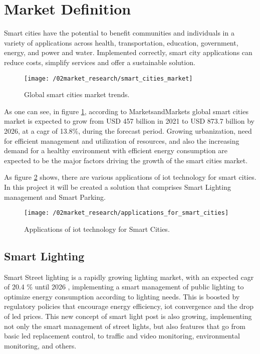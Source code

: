 \section{Market Definition}
Smart cities have the potential to benefit communities and individuals in a variety of applications across health, transportation, education, government, energy, and power and water. Implemented correctly, smart city applications can reduce costs, simplify services and offer a sustainable solution. \cite{smart_city_application_needs} 

\begin{figure}[ht]
	\centering
	\texttt{[image: /02market\_research/smart\_cities\_market]}
	\caption{Global smart cities market trends.}
	\label{fig:smart_city_growth}
\end{figure}

\clearpage

As one can see, in figure \ref{fig:smart_city_growth}, according to MarketsandMarkets \cite{smart_cities_market} global smart cities market is expected to grow from USD 457 billion in 2021 to USD 873.7 billion by 2026, at a \ac{cagr} of 13.8\%, during the forecast period. Growing urbanization, need for efficient management and utilization of resources, and also the increasing demand for a healthy environment with efficient energy consumption are expected to be the major factors driving the growth of the smart cities market.

As figure \ref{fig:smart_cities_sols} shows, there are various applications of \ac{iot} technology for smart cities. In this project it will be created a solution that comprises Smart Lighting management and Smart Parking.

\begin{figure}[ht]
	\centering
	\texttt{[image: /02market\_research/applications\_for\_smart\_cities]}
	\caption{Applications of \ac{iot} technology for Smart Cities. \cite{smart_cities_solutions}}
	\label{fig:smart_cities_sols}
\end{figure}

\subsection{Smart Lighting}
Smart Street lighting is a rapidly growing lighting market, with an expected \ac{cagr} of 20.4 \% until 2026 \cite{smart_light_market}, implementing a smart management of public lighting to optimize energy consumption according to lighting needs. This is boosted by regulatory policies that encourage energy efficiency, \ac{iot} convergence and the drop of \ac{led} prices. This new concept of smart light post is also growing, implementing not only the smart management of street lights, but also features that go from basic \ac{led} replacement control, to traffic and video monitoring, environmental monitoring, and others.

